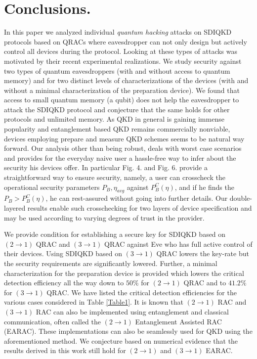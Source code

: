 \documentclass[smallextended]{svjour3}
\begin{document}
%
\section{\label{sec:level1}Conclusions.}


In this paper we analyzed individual {\it quantum hacking} attacks on SDIQKD protocols based on QRACs where eavesdropper can not only design but actively control all devices during the protocol. Looking at these types of attacks was motivated by their recent experimental realizations. We study security against two types of quantum eavesdroppers (with and without access to quantum memory) and for two distinct levels of characterizations of the devices (with and without a minimal characterization of the preparation device). We found that access to small quantum memory (a qubit) does not help the eavesdropper to attack the SDIQKD protocol and conjecture that the same holds for other protocols and unlimited memory.  As QKD in general is gaining immense popularity \cite{QKD1,QKD2,QKD3,QKD5} and entanglement based QKD remains commercially nonviable, devices employing prepare and measure QKD schemes seems to be natural way forward. Our analysis other than being robust, deals with worst case scenarios and provides for the everyday naive user a hassle-free way to infer about the security his devices offer. In particular Fig. 4. and Fig. 6. provide a straightforward way to ensure security, namely, a user can crosscheck the operational security parameters $P_B,\eta_{avg}$ against ${P^C_B(\eta)}$, and if he finds the $P_B>P_B^C(\eta)$, he can rest-assured without going into further details. Our double-layered results enable such crosschecking for two layers of device specification and may be used according to varying degrees of trust in the provider.    

We provide condition for establishing a secure key for SDIQKD based on $(2\to1)$ QRAC and $(3\to1)$ QRAC against Eve who has full active control of their devices. Using SDIQKD based on $(3\to1)$ QRAC lowers the key-rate but the security requirements are significantly lowered. Further, a minimal characterization for the preparation device is provided which lowers the critical detection efficiency all the way down to $50\%$ for $(2\to1)$ QRAC and to $41.2\%$ for $(3\to1)$ QRAC. We have listed the critical detection efficiencies for the various cases considered in Table \ref{Table1}.
It is known that $(2\to1)$ RAC and $(3\to1)$ RAC can also be implemented using entanglement and classical communication, often called the $(2\to1)$ Entanglement Assisted RAC (EARAC). These implementations can also be seamlessly used for QKD using the aforementioned method. We conjecture based on numerical evidence that the results derived in this work still hold for $(2\to1)$ and $(3\to1)$ EARAC.
\end{document}
